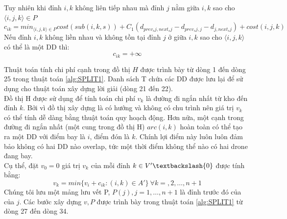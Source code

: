 \documentclass[a4paper,12pt]{report}
\begin{document}
Tuy nhiên khi đỉnh $i,k$ không liên tiếp nhau mà đỉnh $j$ nằm giữa $i,k$ sao cho $\langle i,j,k \rangle \in P$
$$
c_{ik}=min_{\langle i,j,k \rangle \in P} cost(sub(i,k,s))+C_1(d_{prev_sj,next_sj}-d_{prev_sj,j}-d_{j,next_sj})+cost(i,j,k)
$$
Nếu đỉnh $i,k$ không liền nhau và không tồn tại đỉnh $j$ ở giữa $i,k$ sao cho $\langle i,j,k \rangle$ có thể là một DD thì:
$$c_{ik}=+\infty$$

Thuật toán tính chi phí cạnh trong đồ thị $H$ được trình bày từ dòng 1 đến dòng 25 trong thuật toán \ref{alg:SPLIT1}. Danh sách T chứa các DD được lưu lại để sử dụng cho thuật toán xây dựng lời giải (dòng 21 đến 22). \\

Đồ thị H được sử dụng để tính toán chi phí $v_k$ là đường đi ngắn nhất từ kho đến đỉnh $k$. Bởi vì đồ thị xây dựng là có hướng và không có chu trình nên giá trị $v_k$ có thể tính dễ dàng bằng thuật toán quy hoạch động. Hơn nữa, một cạnh trong đường đi ngắn nhất (một cung trong đồ thị H) $arc(i,k)$ hoàn toàn có thể tạo ra một DD với điểm bay là $i$, điểm đón là $k$. Chính lợi điểm này luôn luôn đảm bảo không có hai DD nào overlap, tức một thời điểm không thể nào có hai drone đang bay.  \\

Cụ thể, đặt $v_0=0$ giá trị $v_k$ của mỗi đỉnh $k \in V'\textbackslash \{0\}$ được tính bằng: 
$$v_k=min\{v_i+c_{ik}:(i,k) \in A'\} \ \forall k=,2,\ldots,n+1$$
Chúng tôi lưu một mảng lưu vết P, $P(j), j=1,\ldots,n+1 $ là đỉnh trước đó của của $j$. Các bước xây dựng $v,P$ được trình bày trong thuật toán \ref{alg:SPLIT1} từ dòng 27 đến dòng 34. 
\end{document}
